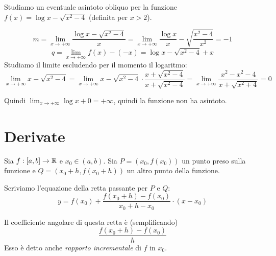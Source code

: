 \begin{example}
Studiamo un eventuale asintoto obliquo per la funzione $f(x) = \log x - \sqrt{x^2-4}$ (definita per $x>2$).

\begin{equation*}
m = \lim_{x \to +\infty} \frac{\log x - \sqrt{x^2-4}}{x} = \lim_{x \to +\infty} \frac{\log x}{x} - \sqrt{\frac{x^2-4}{x^2}} = -1
\end{equation*}
\begin{equation*}
q = \lim_{x \to +\infty} f(x) - (-x) = \log x - \sqrt{x^2-4} + x
\end{equation*}
Studiamo il limite escludendo per il momento il logaritmo:
\begin{equation*}
\lim_{x \to +\infty} x - \sqrt{x^2 - 4} = \lim_{x \to +\infty} x - \sqrt{x^2 - 4} \cdot \frac{x + \sqrt{x^2 - 4}}{x + \sqrt{x^2 - 4}} = \lim_{x \to +\infty} \frac{x^2 - x^2 - 4}{x + \sqrt{x^2 + 4}} = 0
\end{equation*}

Quindi $\lim_{x \to +\infty} \log x + 0 = +\infty$, quindi la funzione non ha asintoto.

\end{example}

\section{Derivate}
Sia $f: [a,b] \to \mathbb R$ e $x_0 \in (a,b)$. Sia $P = (x_0, f(x_0))$ un punto preso sulla funzione e $Q = (x_0 + h, f(x_0+h))$ un altro punto della funzione.

\begin{center}
\end{center}

Scriviamo l'equazione della retta passante per $P$ e $Q$:
\begin{equation*}
y = f(x_0) + \frac{f(x_0+h)-f(x_0)}{x_0 + h - x_0} \cdot (x-x_0)
\end{equation*}

Il coefficiente angolare di questa retta è (semplificando)
\begin{equation*}
\frac{f(x_0+h)-f(x_0)}{h}
\end{equation*}
Esso è detto anche \emph{rapporto incrementale} di $f$ in $x_0$.


